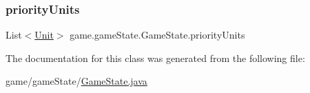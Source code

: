 \subsubsection{\texorpdfstring{priority\+Units}{priorityUnits}}
{\footnotesize\ttfamily List$<$\mbox{\hyperlink{classgame_1_1board_1_1_unit}{Unit}}$>$ game.\+game\+State.\+Game\+State.\+priority\+Units\hspace{0.3cm}{\ttfamily [private]}}



The documentation for this class was generated from the following file\+:\begin{DoxyCompactItemize}
\item 
game/game\+State/\mbox{\hyperlink{_game_state_8java}{Game\+State.\+java}}\end{DoxyCompactItemize}
